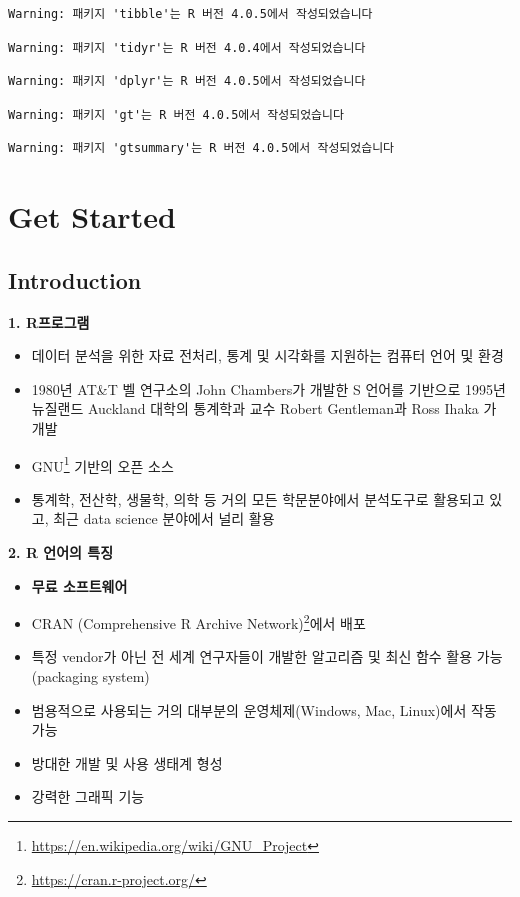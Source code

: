 \documentclass[
  11pt,
]{krantz}
\providecommand{\tightlist}{%
  \setlength{\itemsep}{0pt}\setlength{\parskip}{0pt}}
\renewcommand{\href}[2]{#2\footnote{\url{#1}}}
\begin{document}
\begin{verbatim}
Warning: 패키지 'tibble'는 R 버전 4.0.5에서 작성되었습니다
\end{verbatim}

\begin{verbatim}
Warning: 패키지 'tidyr'는 R 버전 4.0.4에서 작성되었습니다
\end{verbatim}

\begin{verbatim}
Warning: 패키지 'dplyr'는 R 버전 4.0.5에서 작성되었습니다
\end{verbatim}

\begin{verbatim}
Warning: 패키지 'gt'는 R 버전 4.0.5에서 작성되었습니다
\end{verbatim}

\begin{verbatim}
Warning: 패키지 'gtsummary'는 R 버전 4.0.5에서 작성되었습니다
\end{verbatim}

\normalsize

\hypertarget{part-get-started}{%
\part{Get Started}\label{part-get-started}}

\hypertarget{intro-chap}{%
\chapter{Introduction}\label{intro-chap}}

\textbf{1. R프로그램}

\begin{itemize}
\tightlist
\item
  데이터 분석을 위한 자료 전처리, 통계 및 시각화를 지원하는 컴퓨터 언어 및 환경
\item
  1980년 AT\&T 벨 연구소의 John Chambers가 개발한 S 언어를 기반으로 1995년 뉴질랜드 Auckland 대학의 통계학과 교수 Robert Gentleman과 Ross Ihaka 가 개발
\item
  \href{https://en.wikipedia.org/wiki/GNU_Project}{GNU} 기반의 오픈 소스
\item
  통계학, 전산학, 생물학, 의학 등 거의 모든 학문분야에서 분석도구로 활용되고 있고, 최근 data science 분야에서 널리 활용
\end{itemize}

\textbf{2. R 언어의 특징}

\begin{itemize}
\tightlist
\item
  \textbf{무료 소프트웨어}
\item
  \href{https://cran.r-project.org/}{CRAN (Comprehensive R Archive Network)}에서 배포
\item
  특정 vendor가 아닌 전 세계 연구자들이 개발한 알고리즘 및 최신 함수 활용 가능(packaging system)
\item
  범용적으로 사용되는 거의 대부분의 운영체제(Windows, Mac, Linux)에서 작동 가능
\item
  방대한 개발 및 사용 생태계 형성
\item
  강력한 그래픽 기능
\end{itemize}
\end{document}

